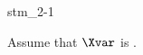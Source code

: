 \documentclass{stex}
\begin{document}
\begin{smodule}{stm_2-1}
  
  \begin{sassertion}[id=stm-2.1]
    Assume that $\Xvar$ is .
  \end{sassertion}
\end{smodule}
\end{document}

